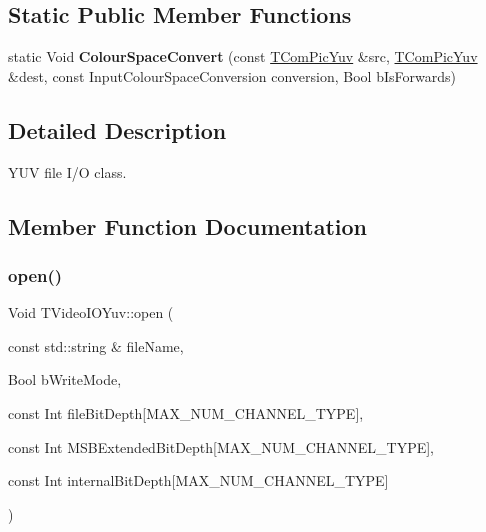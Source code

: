 \subsection*{Static Public Member Functions}
\begin{DoxyCompactItemize}
\item 
\mbox{\label{class_t_video_i_o_yuv_a2f8830d0445a55bc8621f966f25a59a4}} 
static Void {\bfseries Colour\+Space\+Convert} (const \hyperlink{class_t_com_pic_yuv}{T\+Com\+Pic\+Yuv} \&src, \hyperlink{class_t_com_pic_yuv}{T\+Com\+Pic\+Yuv} \&dest, const Input\+Colour\+Space\+Conversion conversion, Bool b\+Is\+Forwards)
\end{DoxyCompactItemize}


\subsection{Detailed Description}
Y\+UV file I/O class. 

\subsection{Member Function Documentation}
\mbox{\label{class_t_video_i_o_yuv_a65a9025501cfaa3d9c682d1a51c5d458}} 
\subsubsection{\texorpdfstring{open()}{open()}}
{\footnotesize\ttfamily Void T\+Video\+I\+O\+Yuv\+::open (\begin{DoxyParamCaption}\item[{const std\+::string \&}]{file\+Name,  }\item[{Bool}]{b\+Write\+Mode,  }\item[{const Int}]{file\+Bit\+Depth\mbox{[}\+M\+A\+X\+\_\+\+N\+U\+M\+\_\+\+C\+H\+A\+N\+N\+E\+L\+\_\+\+T\+Y\+P\+E\mbox{]},  }\item[{const Int}]{M\+S\+B\+Extended\+Bit\+Depth\mbox{[}\+M\+A\+X\+\_\+\+N\+U\+M\+\_\+\+C\+H\+A\+N\+N\+E\+L\+\_\+\+T\+Y\+P\+E\mbox{]},  }\item[{const Int}]{internal\+Bit\+Depth\mbox{[}\+M\+A\+X\+\_\+\+N\+U\+M\+\_\+\+C\+H\+A\+N\+N\+E\+L\+\_\+\+T\+Y\+P\+E\mbox{]} }\end{DoxyParamCaption})}



